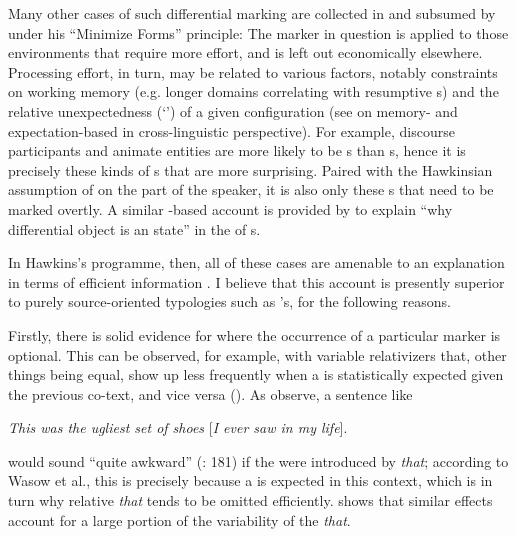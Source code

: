 \documentclass[output=paper]{langsci/langscibook}
\begin{document}
Many other cases of such differential marking are collected in \citet{Haspelmath2008_Econ} and subsumed by \citet{Hawkins2004_Eff,Hawkins2014_VarEff} under his “Minimize Forms” principle: The marker in question is applied to those environments that require more  effort, and is left out economically elsewhere. Processing effort, in turn, may be related to various factors, notably constraints on working memory (e.g. longer  domains correlating with resumptive s) and the relative unexpectedness (‘’) of a given configuration (see \citealt{NorcliffeEtAl2015} on memory- and expectation-based  in cross-linguistic perspective). For example, discourse participants and animate entities are more likely to be s than s, hence it is precisely these kinds of s that are more surprising. Paired with the Hawkinsian assumption of  on the part of the speaker, it is also only these s that need to be marked overtly. A similar -based account is provided by \citet{Haig2018_DOI} to explain “why differential object  is an  state” \citep[781]{Haig2018_DOI} in the  of  s.

In Hawkins’s programme, then, all of these cases are amenable to an explanation in terms of efficient information . I believe that this account is presently superior to purely source-oriented typologies such as ’s, for the following reasons.

Firstly, there is solid evidence for  where the occurrence of a particular marker is optional. This can be observed, for example, with variable relativizers that, other things being equal, show up less frequently when a  is statistically expected given the previous co-text, and vice versa (\citealt{WasowEtAl2011}). As \citet{FoxThompson2007} observe, a sentence like

\ea
{\textit{This was the ugliest set of shoes} [\textit{I ever saw in my life}].} \\
\z

\noindent would sound “quite awkward” (\citealt{WasowEtAl2011}: 181) if the  were introduced by \textit{that}; according to Wasow et al., this is precisely because a  is expected in this context, which is in turn why relative \textit{that} tends to be omitted efficiently. \citet{Jaeger2010_Red} shows that similar  effects account for a large portion of the variability of the   \textit{that}. 
\end{document}
